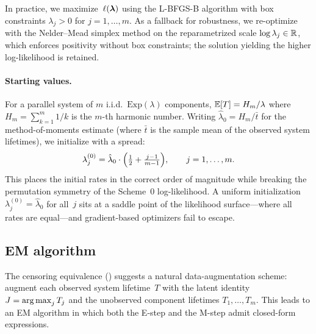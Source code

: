In practice, we maximize~$\ell(\boldsymbol{\lambda})$ using the L-BFGS-B algorithm
with box constraints $\lambda_j > 0$ for $j = 1,\ldots,m$.  As a
fallback for robustness, we re-optimize with the
Nelder--Mead simplex method on the reparametrized scale
$\log\lambda_j \in \mathbb{R}$, which enforces positivity without box
constraints; the solution yielding the higher log-likelihood is
retained.

\paragraph{Starting values.}
For a parallel system of $m$ i.i.d.\ $\mathrm{Exp}(\lambda)$ components,
$\mathbb{E}[T] = H_m / \lambda$ where $H_m = \sum_{k=1}^{m} 1/k$ is the $m$-th
harmonic number.  Writing $\hat\lambda_0 = H_m / \bar{t}$ for the
method-of-moments estimate (where $\bar{t}$ is the sample mean of the
observed system lifetimes), we initialize with a spread:
\begin{equation}\label{eq:spread-init}
  \lambda_j^{(0)} = \hat\lambda_0 \cdot
  \Bigl(\tfrac{1}{2} + \tfrac{j-1}{m-1}\Bigr), \qquad j = 1,\ldots,m.
\end{equation}
This places the initial rates in the correct order of magnitude while
breaking the permutation symmetry of the Scheme~0 log-likelihood.
A uniform initialization $\lambda_j^{(0)} = \hat\lambda_0$ for all~$j$
sits at a saddle point of the likelihood surface---where all rates are
equal---and gradient-based optimizers fail to escape.

\subsection{EM algorithm}
\label{sub:em-algorithm}

The censoring equivalence ()
suggests a natural data-augmentation scheme: augment each observed
system lifetime~$T$ with the latent identity $J = \operatorname*{arg\,max}_j T_j$ and
the unobserved component lifetimes $T_1,\ldots,T_m$.  This leads to an
EM algorithm in which both the E-step and the M-step admit closed-form
expressions.

